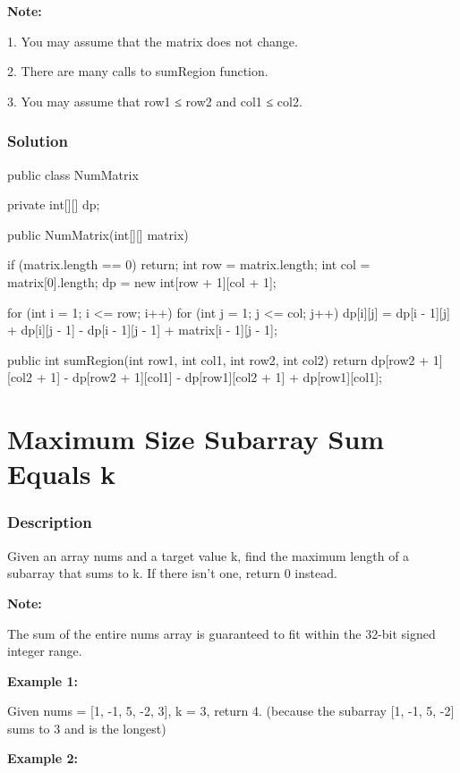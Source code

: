 \textbf{Note:}

1. You may assume that the matrix does not change.

2. There are many calls to sumRegion function.

3. You may assume that row1 ≤ row2 and col1 ≤ col2.

\subsubsection{Solution}

\begin{Code}
public class NumMatrix {
    private int[][] dp;

    public NumMatrix(int[][] matrix) {
        if (matrix.length == 0) {
            return;
        }
        int row = matrix.length;
        int col = matrix[0].length;
        dp = new int[row + 1][col + 1];

        for (int i = 1; i <= row; i++) {
            for (int j = 1; j <= col; j++) {
                dp[i][j] = dp[i - 1][j] + dp[i][j - 1] - dp[i - 1][j - 1] + matrix[i - 1][j - 1];
            }
        }
    }

    public int sumRegion(int row1, int col1, int row2, int col2) {
        return dp[row2 + 1][col2 + 1] - dp[row2 + 1][col1] - dp[row1][col2 + 1] + dp[row1][col1];
    }
}
\end{Code}

\newpage

\section{Maximum Size Subarray Sum Equals k} %

\subsubsection{Description}
Given an array nums and a target value k, find the maximum length of a subarray that sums to k. If there isn't one, return 0 instead.

\textbf{Note:}

The sum of the entire nums array is guaranteed to fit within the 32-bit signed integer range.

\textbf{Example 1:}

Given nums = [1, -1, 5, -2, 3], k = 3,
return 4. (because the subarray [1, -1, 5, -2] sums to 3 and is the longest)

\textbf{Example 2:}

